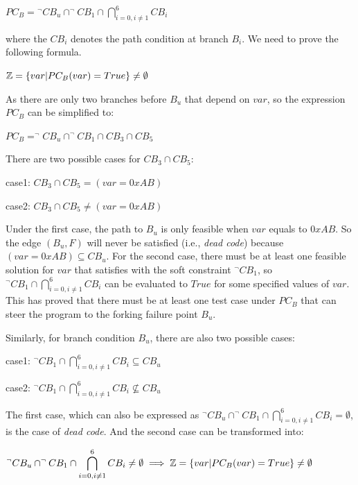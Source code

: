 \begin{center}
$PC_B = \displaystyle ^\neg CB_u \cap ^\neg CB_1 \cap \bigcap\limits_{i=0,i \neq 1}^{6} CB_i$
\end{center}
\noindent where the $CB_i$ denotes the path condition at branch $B_i$. We need to prove the following formula.

\begin{center}
$\mathbb{Z} = \{var\arrowvert PC_B(var) = True\} \neq \emptyset$
\end{center}

As there are only two branches before $B_u$ that depend on $var$, so the expression $PC_B$ can be simplified to:
\begin{center}
$PC_B = ^\neg CB_u \cap ^\neg CB_1 \cap CB_3 \cap CB_5$
\end{center}

There are two possible cases for $CB_3 \cap CB_5$:
\begin{center}
case1: $CB_3 \cap CB_5 = (var = 0xAB)$

case2: $CB_3 \cap CB_5 \neq (var = 0xAB)$
\end{center}

Under the first case, the path to $B_u$ is only feasible when $var$ equals to $0xAB$. So the edge $(B_u, F)$ will never be satisfied (i.e., \emph{dead code}) because $(var = 0xAB) \subseteq CB_u$. For the second case, there must be at least one feasible solution for $var$ that satisfies with the soft constraint $^\neg CB_1$, so $^\neg CB_1 \cap \bigcap_{i=0,i \neq 1}^{6} CB_i$ can be evaluated to $True$ for some specified values of $var$. This has proved that there must be at least one test case under $PC_B$ that can steer the program to the forking failure point $B_u$.

Similarly, for branch condition $B_u$, there are also two possible cases:
\begin{center}
case1: $\displaystyle ^\neg CB_1 \cap \bigcap\limits_{i=0,i\neq 1}^6 CB_i \subseteq CB_u$

case2: $\displaystyle ^\neg CB_1 \cap \bigcap\limits_{i=0,i\neq 1}^6 CB_i \nsubseteq CB_u$
\end{center}

The first case, which can also be expressed as $^\neg CB_u \cap ^\neg CB_1 \cap \bigcap_{i=0,i\neq 1}^6 CB_i = \emptyset$, is the case of \emph{dead code}. And the second case can be transformed into:
\begin{center}
$\displaystyle ^\neg CB_u \cap ^\neg CB_1 \cap \bigcap\limits_{i=0,i\neq 1}^6 CB_i \neq \emptyset \implies \mathbb{Z} = \{var\arrowvert PC_B(var) = True\} \neq \emptyset$
\end{center}

